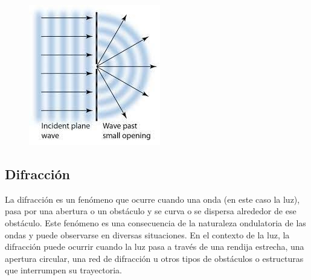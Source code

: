 \documentclass[twocolumn, 12pt]{article}
\begin{document}
\begin{figure}[H]
      \begin{center}
            \includegraphics[width=.9\linewidth]{./Images/5.jpg}
      \end{center}
      \caption{}
\end{figure}

\subsection{Difracción}

La difracción es un fenómeno que ocurre cuando una onda (en
este caso la luz), pasa por una abertura o un obstáculo y
se curva o se dispersa alrededor de ese obstáculo. Este
fenómeno es una consecuencia de la naturaleza ondulatoria
de las ondas y puede observarse en diversas situaciones. En
el contexto de la luz, la difracción puede ocurrir cuando
la luz pasa a través de una rendija estrecha, una apertura
circular, una red de difracción u otros tipos de obstáculos
o estructuras que interrumpen su trayectoria.
\end{document}
